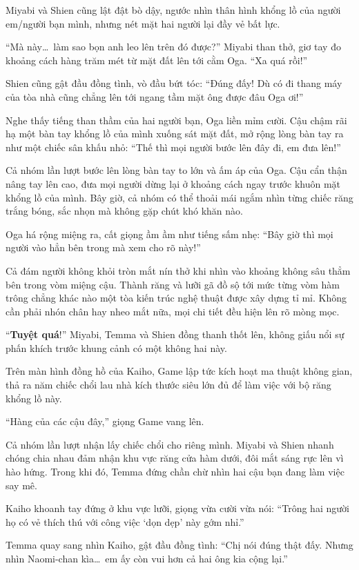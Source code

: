 \documentclass[../main.tex]{subfiles}
\begin{document}
Miyabi và Shien cũng lật đật bò dậy, ngước nhìn thân hình khổng lồ của người em/người bạn mình, nhưng nét mặt hai người lại đầy vẻ bất lực.

``Mà này\dots\ làm sao bọn anh leo lên trên đó được?'' Miyabi than thở, giơ tay đo khoảng cách hàng trăm mét từ mặt đất lên tới cằm Oga. ``Xa quá rồi!''

Shien cũng gật đầu đồng tình, vò đầu bứt tóc: ``Đúng đấy! Dù có đi thang máy của tòa nhà cũng chẳng lên tới ngang tầm mặt ông được đâu Oga ơi!''

Nghe thấy tiếng than thầm của hai người bạn, Oga liền mỉm cười. Cậu chậm rãi hạ một bàn tay khổng lồ của mình xuống sát mặt đất, mở rộng lòng bàn tay ra như một chiếc sân khấu nhỏ: ``Thế thì mọi người bước lên đây đi, em đưa lên!''

Cả nhóm lần lượt bước lên lòng bàn tay to lớn và ấm áp của Oga. Cậu cẩn thận nâng tay lên cao, đưa mọi người dừng lại ở khoảng cách ngay trước khuôn mặt khổng lồ của mình. Bây giờ, cả nhóm có thể thoải mái ngắm nhìn từng chiếc răng trắng bóng, sắc nhọn mà không gặp chút khó khăn nào.

Oga há rộng miệng ra, cất giọng ầm ầm như tiếng sấm nhẹ: ``Bây giờ thì mọi người vào hẳn bên trong mà xem cho rõ này!''

Cả đám người không khỏi tròn mắt nín thở khi nhìn vào khoảng không sâu thẳm bên trong vòm miệng cậu. Thành răng và lưỡi gã đồ sộ tới mức từng vòm hàm trông chẳng khác nào một tòa kiến trúc nghệ thuật được xây dựng tỉ mỉ. Không cần phải nhón chân hay nheo mắt nữa, mọi chi tiết đều hiện lên rõ mòng mọc.

``\textbf{Tuyệt quá}!'' Miyabi, Temma và Shien đồng thanh thốt lên, không giấu nổi sự phấn khích trước khung cảnh có một không hai này.

Trên màn hình đồng hồ của Kaiho, Game lập tức kích hoạt ma thuật không gian, thả ra năm chiếc chổi lau nhà kích thước siêu lớn đủ để làm việc với bộ răng khổng lồ này.

``Hàng của các cậu đây,'' giọng Game vang lên.

Cả nhóm lần lượt nhận lấy chiếc chổi cho riêng mình. Miyabi và Shien nhanh chóng chia nhau đảm nhận khu vực răng cửa hàm dưới, đôi mắt sáng rực lên vì hào hứng. Trong khi đó, Temma đứng chần chừ nhìn hai cậu bạn đang làm việc say mê.

Kaiho khoanh tay đứng ở khu vực lưỡi, giọng vừa cười vừa nói: ``Trông hai người họ có vẻ thích thú với công việc `dọn dẹp' này gớm nhỉ.''

Temma quay sang nhìn Kaiho, gật đầu đồng tình: ``Chị nói đúng thật đấy. Nhưng nhìn Naomi-chan kìa\dots\ em ấy còn vui hơn cả hai ông kia cộng lại.''
\end{document}
